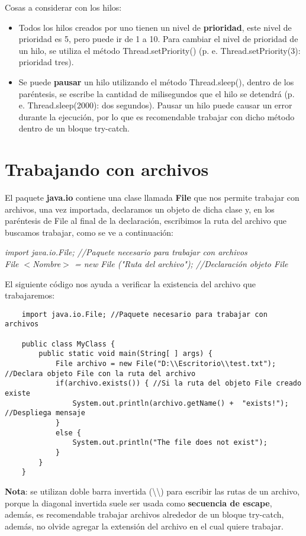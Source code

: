Cosas a considerar con los hilos:
\begin{itemize}
    \item Todos los hilos creados por uno tienen un nivel de \textbf{prioridad}, este nivel de prioridad es 5, pero puede ir de 1 a 10. Para cambiar el nivel de prioridad de un hilo, se utiliza el método Thread.setPriority() (p. e. Thread.setPriority(3): prioridad tres).
    \item Se puede \textbf{pausar} un hilo utilizando el método Thread.sleep(), dentro de los paréntesis, se escribe la cantidad de milisegundos que el hilo se detendrá (p. e. Thread.sleep(2000): dos segundos). Pausar un hilo puede causar un error durante la ejecución, por lo que es recomendable trabajar con dicho método dentro de un bloque try-catch.
\end{itemize}



\section{Trabajando con archivos}
El paquete \textbf{java.io} contiene una clase llamada \textbf{File} que nos permite trabajar con archivos, una vez importada, declaramos un objeto de dicha clase y, en los paréntesis de File al final de la declaración, escribimos la ruta del archivo que buscamos trabajar, como se ve a continuación:
\begin{center}\textit{import java.io.File; //Paquete necesario para trabajar con archivos\\File $<$Nombre$>$ = new File ("Ruta del archivo"); //Declaración objeto File}\end{center}
El siguiente código nos ayuda a verificar la existencia del archivo que trabajaremos:
\begin{lstlisting}
    import java.io.File; //Paquete necesario para trabajar con archivos

    public class MyClass {
        public static void main(String[ ] args) {
            File archivo = new File("D:\\Escritorio\\test.txt"); //Declara objeto File con la ruta del archivo
            if(archivo.exists()) { //Si la ruta del objeto File creado existe
                System.out.println(archivo.getName() +  "exists!"); //Despliega mensaje
            }
            else { 
                System.out.println("The file does not exist");
            }
        }
    }
\end{lstlisting}
\textbf{Nota}: se utilizan doble barra invertida (\textbackslash\textbackslash) para escribir las rutas de un archivo, porque la diagonal invertida suele ser usada como \textbf{secuencia de escape}, además, es recomendable trabajar archivos alrededor de un bloque try-catch, además, no olvide agregar la extensión del archivo en el cual quiere trabajar.

